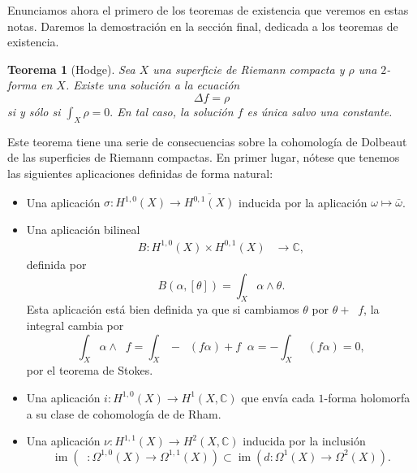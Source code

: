 \documentclass[autocontact]{gaceta}
\newtheorem{thm}{Teorema}[section]
\theoremstyle{definition} \newtheorem{defn}[thm]{Definición}
\theoremstyle{definition} \newtheorem{ejemplo}[thm]{Ejemplo}
\theoremstyle{definition} \newtheorem{ejercicio}[thm]{Ejercicio}
\def\CC{\mathbb{C}}
\DeclareMathOperator{\delbar}{\bar{\partial}}
\DeclareMathOperator{\im}{im}
\begin{document}
Enunciamos ahora el primero de los teoremas de existencia que veremos en estas notas. Daremos la demostración en la sección final, dedicada a los teoremas de existencia.

\begin{thm}[Hodge]
  Sea $X$ una superficie de Riemann compacta y $\rho$ una $2$-forma en $X$. Existe una solución a la ecuación $$\Delta f=\rho$$
  si y sólo si $\int_X \rho = 0.$
  En tal caso, la solución $f$ es única salvo una constante.
\end{thm}

Este teorema tiene una serie de consecuencias sobre la cohomología de Dolbeaut de las superficies de Riemann compactas. En primer lugar, nótese que tenemos las siguientes aplicaciones definidas de forma natural:
\begin{itemize}
  \item Una aplicación $\sigma: H^{1,0}(X) \rightarrow \overline{H^{0,1}(X)}$ inducida por la aplicación $\omega \mapsto \bar{\omega}$.
  \item Una aplicación bilineal
    \begin{align*}
      B :H^{1,0}(X) \times H^{0,1}(X) &\longrightarrow \CC,
      \end{align*}
      definida por
      \begin{equation*}
	B(\alpha,[\theta]) = \int_X \alpha \wedge \theta.
      \end{equation*}
      Esta aplicación está bien definida ya que si cambiamos $\theta$ por $\theta+ \delbar f$, la integral cambia por
      \begin{equation*}
	\int_X \alpha \wedge \delbar f = \int_X -\delbar(f \alpha) + f\delbar \alpha=-\int_X \delbar(f\alpha)=0,
      \end{equation*}
      por el teorema de Stokes.

    \item Una aplicación $i:H^{1,0}(X) \rightarrow H^1(X,\CC)$ que envía cada $1$-forma holomorfa a su clase de cohomología de de Rham.

    \item Una aplicación $\nu: H^{1,1}(X) \rightarrow H^2(X,\CC)$ inducida por la inclusión
      \begin{equation*}
	\im(\delbar: \Omega^{1,0}(X) \rightarrow \Omega^{1,1}(X)) \subset \im(d:\Omega^1(X)\rightarrow \Omega^2(X)).
      \end{equation*}
\end{itemize}
\end{document}
